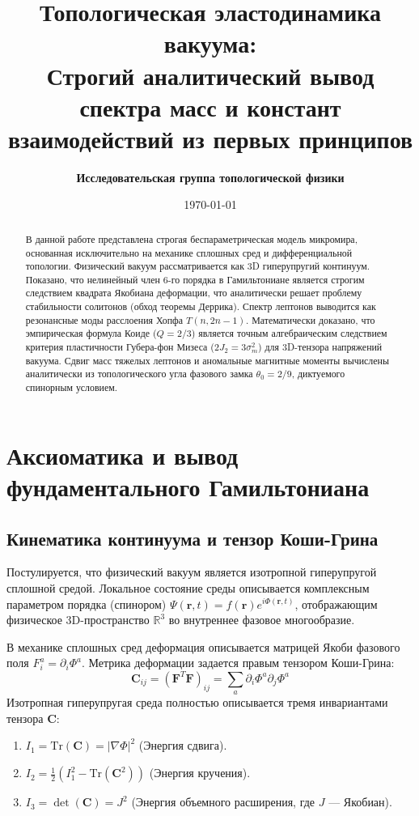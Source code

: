 \documentclass[12pt,a4paper]{article}
\title{\textbf{Топологическая эластодинамика вакуума:\\ Строгий аналитический вывод спектра масс и констант взаимодействий из первых принципов}}
\author{\textbf{Исследовательская группа топологической физики}}
\date{\today}
\begin{document}
	
	\maketitle
	
	\begin{abstract}
		В данной работе представлена строгая беспараметрическая модель микромира, основанная исключительно на механике сплошных сред и дифференциальной топологии. Физический вакуум рассматривается как 3D гиперупругий континуум. Показано, что нелинейный член 6-го порядка в Гамильтониане является строгим следствием квадрата Якобиана деформации, что аналитически решает проблему стабильности солитонов (обход теоремы Деррика). 
		Спектр лептонов выводится как резонансные моды расслоения Хопфа $T(n, 2n-1)$. Математически доказано, что эмпирическая формула Коиде ($Q=2/3$) является точным алгебраическим следствием критерия пластичности Губера-фон Мизеса ($2J_2 = 3\sigma_m^2$) для 3D-тензора напряжений вакуума. Сдвиг масс тяжелых лептонов и аномальные магнитные моменты вычислены аналитически из топологического угла фазового замка $\theta_0 = 2/9$, диктуемого спинорным условием.
	\end{abstract}
	
	\tableofcontents
	\newpage
	
	\section{Аксиоматика и вывод фундаментального Гамильтониана}
	
	\subsection{Кинематика континуума и тензор Коши-Грина}
	Постулируется, что физический вакуум является изотропной гиперупругой сплошной средой. Локальное состояние среды описывается комплексным параметром порядка (спинором) $\Psi(\mathbf{r}, t) = f(\mathbf{r}) e^{i\Phi(\mathbf{r}, t)}$, отображающим физическое 3D-пространство $\mathbb{R}^3$ во внутреннее фазовое многообразие.
	
	В механике сплошных сред деформация описывается матрицей Якоби фазового поля $F_{i}^a = \partial_i \Phi^a$. Метрика деформации задается правым тензором Коши-Грина:
	\begin{equation}
		\mathbf{C}_{ij} = (\mathbf{F}^T \mathbf{F})_{ij} = \sum_a \partial_i \Phi^a \partial_j \Phi^a
	\end{equation}
	Изотропная гиперупругая среда полностью описывается тремя инвариантами тензора $\mathbf{C}$:
	\begin{enumerate}
		\item $I_1 = \text{Tr}(\mathbf{C}) = |\nabla \Phi|^2$ (Энергия сдвига).
		\item $I_2 = \frac{1}{2} (I_1^2 - \text{Tr}(\mathbf{C}^2))$ (Энергия кручения).
		\item $I_3 = \det(\mathbf{C}) = J^2$ (Энергия объемного расширения, где $J$ — Якобиан).
	\end{enumerate}
	
\end{document}
